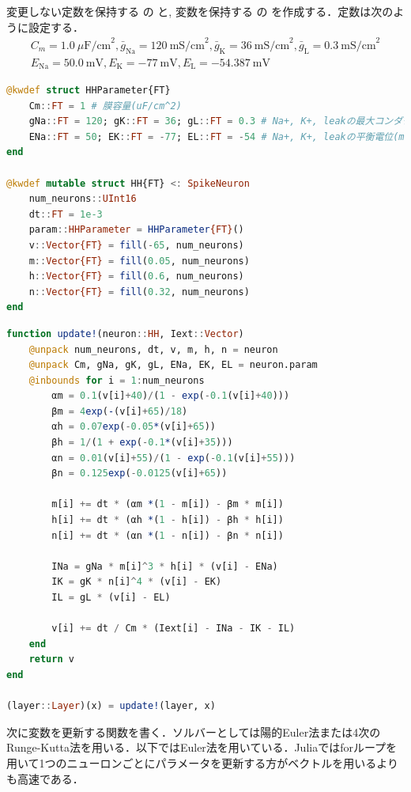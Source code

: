 変更しない定数を保持する  の  と, 変数を保持する  の  を作成する．定数は次のように設定する． 
\begin{equation}
\begin{array}{l}
C_m=1.0\ \mu\textrm{F/cm}^2, \bar{g}_{\text{Na}}=120\ \textrm{mS/cm}^2, \bar{g}_{\text{K}}=36\ \textrm{mS/cm}^2, \bar{g}_{\text{L}}=0.3\ \textrm{mS/cm}^2\\
E_{\text{Na}}=50.0\ \textrm{mV}, E_{\text{K}}=-77\ \textrm{mV}, E_{\text{L}}=-54.387\ \textrm{mV} 
\end{array}
\end{equation}
\begin{lstlisting}[language=julia]
@kwdef struct HHParameter{FT}
    Cm::FT = 1 # 膜容量(uF/cm^2)
    gNa::FT = 120; gK::FT = 36; gL::FT = 0.3 # Na+, K+, leakの最大コンダクタンス(mS/cm^2)
    ENa::FT = 50; EK::FT = -77; EL::FT = -54 # Na+, K+, leakの平衡電位(mV)
end

@kwdef mutable struct HH{FT} <: SpikeNeuron
    num_neurons::UInt16
    dt::FT = 1e-3
    param::HHParameter = HHParameter{FT}()
    v::Vector{FT} = fill(-65, num_neurons)
    m::Vector{FT} = fill(0.05, num_neurons) 
    h::Vector{FT} = fill(0.6, num_neurons)
    n::Vector{FT} = fill(0.32, num_neurons)
end
\end{lstlisting}
\begin{lstlisting}[language=julia]
function update!(neuron::HH, Iext::Vector)
    @unpack num_neurons, dt, v, m, h, n = neuron
    @unpack Cm, gNa, gK, gL, ENa, EK, EL = neuron.param
    @inbounds for i = 1:num_neurons
        αm = 0.1(v[i]+40)/(1 - exp(-0.1(v[i]+40)))
        βm = 4exp(-(v[i]+65)/18)
        αh = 0.07exp(-0.05*(v[i]+65))
        βh = 1/(1 + exp(-0.1*(v[i]+35)))
        αn = 0.01(v[i]+55)/(1 - exp(-0.1(v[i]+55)))
        βn = 0.125exp(-0.0125(v[i]+65))
        
        m[i] += dt * (αm *(1 - m[i]) - βm * m[i])
        h[i] += dt * (αh *(1 - h[i]) - βh * h[i])
        n[i] += dt * (αn *(1 - n[i]) - βn * n[i])
        
        INa = gNa * m[i]^3 * h[i] * (v[i] - ENa)
        IK = gK * n[i]^4 * (v[i] - EK)
        IL = gL * (v[i] - EL)
        
        v[i] += dt / Cm * (Iext[i] - INa - IK - IL)
    end
    return v
end

(layer::Layer)(x) = update!(layer, x)
\end{lstlisting}
次に変数を更新する関数を書く．ソルバーとしては陽的Euler法または4次のRunge-Kutta法を用いる．以下ではEuler法を用いている．Juliaではforループを用いて1つのニューロンごとにパラメータを更新する方がベクトルを用いるよりも高速である．
